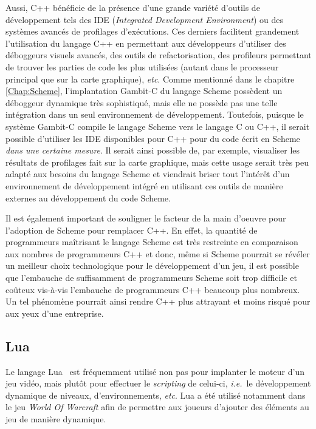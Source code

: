 \documentclass[12pt,twoside,letterpaper,francais]{book}
\newcommand{\ie}{{\textit{i.e.}~}}
\begin{document}
Aussi, C++ bénéficie de la présence d'une grande variété d'outils de
développement tels des IDE (\textit{Integrated Development
  Environment}) ou des systèmes avancés de profilages
d'exécutions. Ces derniers facilitent grandement l'utilisation du
langage C++ en permettant aux développeurs d'utiliser des déboggeurs
visuels avancés, des outils de refactorisation, des profileurs
permettant de trouver les parties de code les plus utilisées (autant
dans le processeur principal que sur la carte graphique),
\textit{etc}. Comme mentionné dans le chapitre \ref{Chap:Scheme},
l'implantation Gambit-C du langage Scheme possèdent un déboggeur
dynamique très sophistiqué, mais elle ne possède pas une telle
intégration dans un seul environnement de développement. Toutefois,
puisque le système Gambit-C compile le langage Scheme vers le langage
C ou C++, il serait possible d'utiliser les IDE disponibles pour C++
pour du code écrit en Scheme \textit{dans une certaine mesure}. Il
serait ainsi possible de, par exemple, visualiser les résultats de
profilages fait sur la carte graphique, mais cette usage serait très
peu adapté aux besoins du langage Scheme et viendrait briser tout
l'intérêt d'un environnement de développement intégré en utilisant ces
outils de manière externes au développement du code Scheme.

Il est également important de souligner le facteur de la main d'oeuvre
pour l'adoption de Scheme pour remplacer C++. En effet, la
quantité de programmeurs maîtrisant le langage Scheme est très
restreinte en comparaison aux nombres de programmeurs C++ et donc,
même si Scheme pourrait se révéler un meilleur choix
technologique pour le dévelop\-pement d'un jeu, il est possible que
l'embauche de suffisamment de programmeurs Scheme soit trop
difficile et coûteux vis-à-vis l'embauche de programmeurs C++ beaucoup
plus nombreux. Un tel phénomène pourrait ainsi rendre C++ plus
attrayant et moins risqué pour aux yeux d'une entreprise.


\FloatBarrier
\subsection{Lua}
Le langage Lua~\cite{Lua} est fréquemment utilisé non pas pour
implanter le moteur d'un jeu vidéo, mais plutôt pour effectuer le
\textit{scripting} de celui-ci, \ie le dévelop\-pement dynamique de
niveaux, d'environnements, \textit{etc}. Lua a été utilisé notamment
dans le jeu \textit{World Of Warcraft} afin de permettre aux joueurs
d'ajouter des éléments au jeu de manière dynamique.
\end{document}
